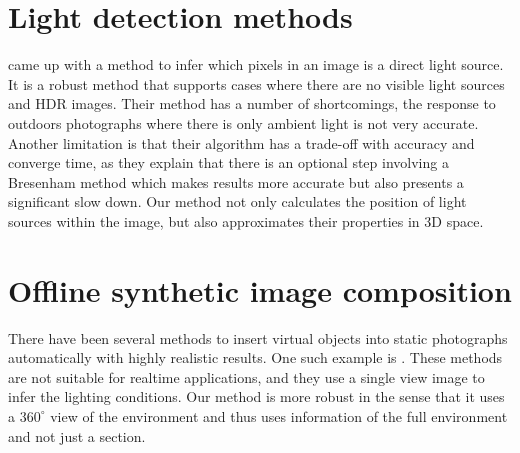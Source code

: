 \section{Light detection methods}
\citep{Laskowski2007} came up with a method to infer which pixels in an image is a direct light source. It is a robust method that supports cases where there are no visible light sources and HDR images. Their method has a number of shortcomings, the response to outdoors photographs where there is only ambient light is not very accurate. Another limitation is that their algorithm has a trade-off with accuracy and converge time, as they explain that there is an optional step involving a Bresenham method which makes results more accurate but also presents a significant slow down. Our method not only calculates the position of light sources within the image, but also approximates their properties in 3D space. \newline
\section{Offline synthetic image composition} 
There have been several methods to insert virtual objects into static photographs automatically with highly realistic results. One such example is \citep{karsh2014}. These methods are not suitable for realtime applications, and they use a single view image to infer the lighting conditions. Our method is more robust in the sense that it uses a $360^{\circ}$ view of the environment and thus uses information of the full environment and not just a section.\newline
